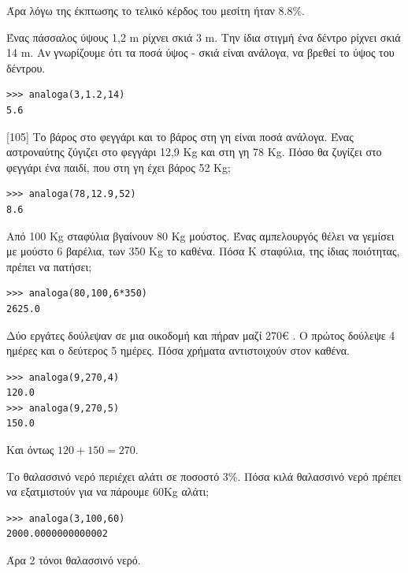 Άρα λόγω της έκπτωσης το τελικό κέρδος του μεσίτη ήταν 8.8\%.
\begin{exercise}
Ένας	πάσσαλος	ύψους	1,2	m	ρίχνει	σκιά	3	m.	Την	ίδια	στιγμή	ένα	δέντρο	ρίχνει	σκιά	14	m.	Αν	γνωρίζουμε	ότι	τα	ποσά	ύψος	-	σκιά	είναι	ανάλογα,	να	βρεθεί	το	ύψος	του	δέντρου.
\end{exercise}
\begin{lstlisting}
>>> analoga(3,1.2,14)
5.6
\end{lstlisting}
\begin{exercise}
[105]
Το	βάρος	στο	φεγγάρι	και	το	βάρος	στη	γη	είναι	ποσά	ανάλογα.	Ένας	αστροναύτης	ζύγιζει	στο	φεγγάρι	12,9	Kg	και	στη	γη	78	Kg.	Πόσο	θα	ζυγίζει	στο	φεγγάρι	ένα	παιδί,	που 	στη	γη	έχει	βάρος	52	Kg;
\end{exercise}
\begin{lstlisting}
>>> analoga(78,12.9,52)
8.6
\end{lstlisting}
\begin{exercise}
Aπό	100	Kg	σταφύλια	βγαίνουν	80	Kg	μούστος.	Ένας	αμπελουργός	θέλει	να	γεμίσει	με	μούστο	6	βαρέλια,	των	350	Kg	το	καθένα.	Πόσα	K	σταφύλια,	της	ίδιας	ποιότητας,	πρέπει	να	πατήσει;
\end{exercise}
\begin{lstlisting}
>>> analoga(80,100,6*350)
2625.0
\end{lstlisting}
\begin{exercise}
Δύο	εργάτες	δούλεψαν	σε	μια	οικοδομή	και	πήραν	μαζί	270€ .	O	πρώτος	δούλεψε	4	ημέρες	και	ο	δεύτερος	5	ημέρες.	Πόσα	χρήματα	αντιστοιχούν	στον	καθένα.
\end{exercise}
\begin{lstlisting}
>>> analoga(9,270,4)
120.0
>>> analoga(9,270,5)
150.0
\end{lstlisting}
Και όντως $120+150=270$.
\begin{exercise}
Το	θαλασσινό	νερό	περιέχει	αλάτι	σε	ποσοστό	3\%.	Πόσα	κιλά	θαλασσινό	νερό	πρέπει	να	εξατμιστούν	για	να	πάρουμε	60Kg	αλάτι;
\end{exercise}
\begin{lstlisting}
>>> analoga(3,100,60)
2000.0000000000002
\end{lstlisting}
Άρα 2 τόνοι θαλασσινό νερό.